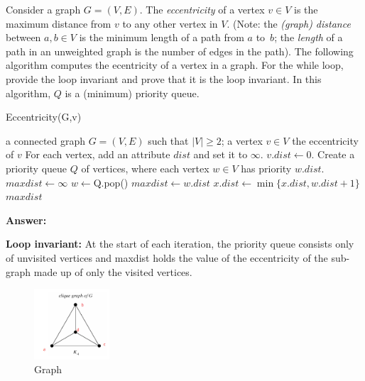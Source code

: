 \documentclass{article}
\begin{document}
\nextprob{}

Consider a graph $G=(V,E)$. The \emph{eccentricity} of a vertex $v \in V$ is the
maximum distance from $v$ to any other vertex in $V$. (Note: the \emph{(graph) distance} between
$a,b\in V$ is the minimum length of a path from $a$ to~$b$; the \emph{length} of
a path in an unweighted graph is the number of edges in the path). The
following algorithm computes the ecentricity of a vertex in a graph.  For the
while loop, provide the loop invariant and prove that it is the loop invariant.
In this algorithm, $Q$ is a (minimum) priority queue.

\begin{algorithm}
    \caption{Eccentricity(G,v)}
    \begin{algorithmic}[1]
        \REQUIRE a connected graph $G=(V,E)$ such that $|V| \geq 2$; a vertex $v \in V$
        \ENSURE the eccentricity of $v$
        \STATE For each vertex, add an attribute $dist$ and set it to $\infty$.
        \STATE $v.dist \gets 0$.
        \STATE Create a priority queue $Q$ of vertices, where each
                vertex $w\in V$ has priority $w.dist$.
        \STATE $maxdist \gets \infty$
            \STATE $w \gets $Q.pop() 
            \STATE $maxdist \gets w.dist$
                \STATE $x.dist \gets \min \{ x.dist, w.dist +1 \} $
            \ENDFOR
        \ENDWHILE
        \RETURN $maxdist$
    \end{algorithmic}
\end{algorithm}

\textbf{Answer:} 

\textbf{Loop invariant:} At the start of each iteration, the priority queue consists only of unvisited vertices and maxdist holds the value of the eccentricity of the sub-graph made up of only the visited vertices.

\begin{figure}[h]
    \centering
    \includegraphics[width=0.25\textwidth]{clique}
    \caption{Graph}
    \label{fig:Graph}
\end{figure}
\end{document}
